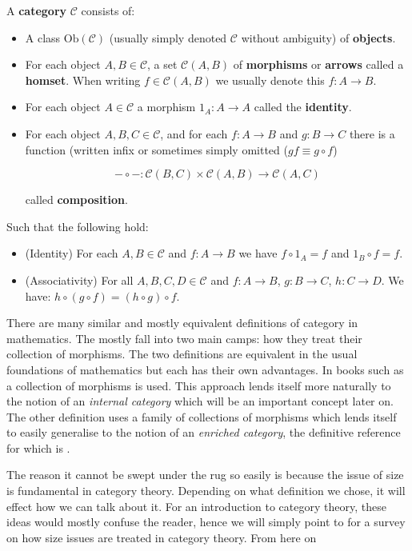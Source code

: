 \begin{defin}
	A {\bf category} $\mathcal{C}$ consists of:
	\begin{itemize}
		\item A class $\text{Ob}(\mathcal{C})$ (usually simply denoted $\mathcal{C}$ without ambiguity) of {\bf objects}.
		\item For each object $A,B \in \mathcal{C}$, a set $\mathcal{C}(A,B)$ of \textbf{morphisms} or \textbf{arrows} called a \textbf{homset}. When writing $f \in \mathcal{C}(A,B)$ we usually denote this $f : A \to B$.
		\item For each object $A \in \mathcal{C}$ a morphism $1_A : A \to A$ called the {\bf identity}.
		\item For each object $A,B,C \in \mathcal{C}$, and for each $f : A \to B$ and $g : B \to C$ there is a function (written infix or sometimes simply omitted ($gf \equiv g \circ f$)
		
		$$
			- \circ - : \mathcal{C}(B,C) \times \mathcal{C}(A,B) \to \mathcal{C}(A,C)
		$$
		
		called {\bf composition}.
	\end{itemize}
	
	Such that the following hold:
	
	\begin{itemize}
		\item (Identity) For each $A,B \in \mathcal{C}$ and $f : A \to B$ we have $f \circ 1_A = f$ and $1_B \circ f = f$.
		\item (Associativity) For all $A,B,C,D \in \mathcal{C}$ and $f : A \to B$, $g : B \to C$, $h : C \to D$. We have: $h \circ (g \circ f) = (h \circ g) \circ f$.
	\end{itemize}
\end{defin}

\begin{remark}
    There are many similar and mostly equivalent definitions of category in mathematics. The mostly fall into two main camps: how they treat their collection of morphisms. The two definitions are equivalent in the usual foundations of mathematics but each has their own advantages. In books such as \cite{riehl2017category} a collection of morphisms is used. This approach lends itself more naturally to the notion of an \textit{internal category} which will be an important concept later on. The other definition uses a family of collections of morphisms which lends itself to easily generalise to the notion of an \textit{enriched category}, the definitive reference for which is \cite{kelly1982basic}.

    The reason it cannot be swept under the rug so easily is because the issue of size is fundamental in category theory. Depending on what definition we chose, it will effect how we can talk about it. For an introduction to category theory, these ideas would mostly confuse the reader, hence we will simply point to \cite{2008arXiv0810.1279S} for a survey on how size issues are treated in category theory. From here on 
\end{remark}

